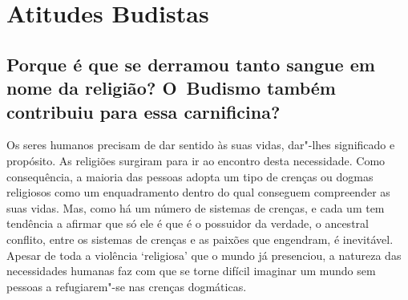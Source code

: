 
\setlength{\chapterTitleTopSkip}{65mm}


\enlargethispage{2\baselineskip}

\chapter{Atitudes Budistas}


\section{Porque é que se derramou tanto sangue em nome da religião? O~Budismo
  também contribuiu para essa carnificina?}

\vspace*{-\baselineskip}

Os seres humanos precisam de dar sentido às suas vidas, dar"-lhes
significado e propósito. As religiões surgiram para ir ao encontro desta
necessidade. Como consequência, a maioria das pessoas adopta um tipo de
crenças ou dogmas religiosos como um enquadramento dentro do qual
conseguem compreender as suas vidas. Mas, como há um número de sistemas
de crenças, e cada um tem tendência a afirmar que só ele é que é o
possuidor da verdade, o ancestral conflito, entre os sistemas de crenças
e as paixões que engendram, é inevitável. Apesar de toda a violência
`religiosa' que o mundo já presenciou, a natureza das necessidades
humanas faz com que se torne difícil imaginar um mundo sem pessoas a
refugiarem"-se nas crenças dogmáticas.

